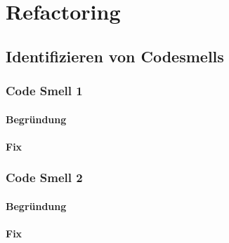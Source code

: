 
\chapter{Refactoring}

\section{Identifizieren von Codesmells}
\subsection{Code Smell 1}
\subsubsection{Begründung}
\subsubsection{Fix}
\subsection{Code Smell 2}
\subsubsection{Begründung}
\subsubsection{Fix}
